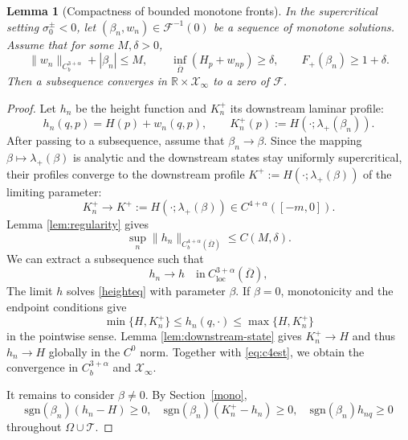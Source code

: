 \documentclass[12pt,letterpaper]{amsart}
\newtheorem{lemma}[theorem]{Lemma}
\numberwithin{equation}{section}
\def\R{{\mathbb R}}
\def\sgn{\mathrm{sgn}}
\begin{document}
\begin{lemma}[Compactness of bounded monotone fronts]\label{lem:compactness}
{In the supercritical setting $\sigma_0^\pm<0$, let $(\beta_n,w_n)\in\mathcal F^{-1}(0)$ be a sequence of monotone solutions.}  Assume that for some \(M,\delta>0\),
\begin{equation*}
 \|w_n\|_{C_b^{3+\alpha}}+|\beta_n|\le M,\qquad
 \inf_{\overline\Omega}(H_p+w_{np})\ge\delta,\qquad
 F_+(\beta_n)\ge 1+\delta.
\end{equation*}
{Then a subsequence converges in $\R\times\mathscr X_\infty$ to a zero of $\mathcal F$.}	
\end{lemma}
\begin{proof}
	{Let $h_n$ be the height function and $K_n^+$ its downstream laminar profile:}
	\begin{equation*}
		h_n(q,p)=H(p)+w_n(q,p),\qquad K_n^{+}(p):=H(\cdot;\lambda_+(\beta_n)).
	\end{equation*}
	{After passing to a subsequence, assume that $\beta_n\to\beta$. Since the mapping $\beta\mapsto\lambda_+(\beta)$ is analytic and the downstream states stay uniformly supercritical, their profiles converge to the downstream profile $K^+:=H(\cdot;\lambda_+(\beta))$ of the limiting parameter:}
	\begin{equation*}
		K_n^{+}\to K^+:=H(\cdot;\lambda_+(\beta))\in C^{4+\alpha}([-m,0]).
	\end{equation*}	
	Lemma \ref{lem:regularity} gives
	\begin{equation}\label{eq:c4est}
		\sup_n\|h_n\|_{C_b^{4+\alpha}(\overline{\Omega})}\leq C(M,\delta).
	\end{equation}
	We can extract a subsequence  such that
	\begin{equation}
		\label{coninbdd}
		h_n\to h\quad\mathrm{in~}C_{\mathrm{loc}}^{3+\alpha}(\overline{\Omega}),
	\end{equation}
	{The limit $h$ solves \eqref{heighteq} with parameter $\beta$. If $\beta=0$, monotonicity and the endpoint conditions give}
	\begin{equation*}
		\min\{H,K_n^+\}\leq h_n(q,\cdot)\leq\max\{H,K_n^+\}
	\end{equation*}
in the pointwise sense. Lemma \ref{lem:downstream-state} gives $K_n^+\to H$ and thus $h_n\to H$ {globally in the $C^0$ norm}. Together with \eqref{eq:c4est}, we obtain the convergence in $C_b^{3+\alpha}$ and $\mathscr{X}_\infty$.
	
	
	
	 {It remains to consider $\beta\ne0$. By Section~\ref{mono},}
	\begin{equation*}
		\sgn(\beta_n)(h_n-H)\geq 0,\quad\sgn(\beta_n)(K_n^+-h_n)\geq0,\quad\sgn(\beta_n)h_{nq}\geq0
	\end{equation*}
	throughout $\Omega\cup\mathcal T$.
	

\end{proof}
\end{document}
